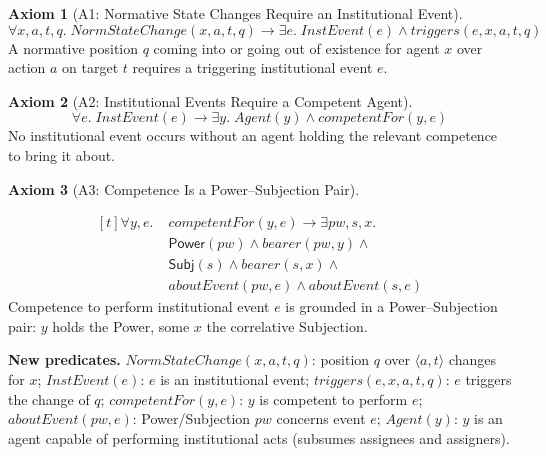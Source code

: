 \documentclass{IOS-Book-Article}
\newcommand{\Power}{\mathsf{Power}}          %
\newcommand{\Subj}{\mathsf{Subj}}       %
\theoremstyle{definition}
\newtheorem{axiom}{Axiom}[section]
\begin{document}
\begin{axiom}[A1: Normative State Changes Require an Institutional Event]
\label{ax:A1}
\[
\forall x,a,t,q.\;
  \mathit{NormStateChange}(x,a,t,q) \to
  \exists e.\;\mathit{InstEvent}(e)\land\mathit{triggers}(e,x,a,t,q)
\]
A normative position $q$ coming into or going out of existence
for agent $x$ over action $a$ on target $t$ requires a triggering
institutional event $e$.
\end{axiom}

\begin{axiom}[A2: Institutional Events Require a Competent Agent]
\label{ax:A2}
\[
\forall e.\;\mathit{InstEvent}(e) \to
  \exists y.\;\mathit{Agent}(y)\land\mathit{competentFor}(y,e)
\]
No institutional event occurs without an agent holding
the relevant competence to bring it about.
\end{axiom}



\begin{axiom}[A3: Competence Is a Power--Subjection Pair]
\label{ax:A3}

\[
\begin{aligned}[t]
\forall y,e.\;&
\mathit{competentFor}(y,e)\to
\exists pw,s,x.\;\\
&\Power(pw)\land\mathit{bearer}(pw,y)\land\\
&\Subj(s)\land\mathit{bearer}(s,x)\land\\
&\mathit{aboutEvent}(pw,e)\land\mathit{aboutEvent}(s,e)
\end{aligned}
\]
Competence to perform institutional event $e$ is grounded in
a Power--Subjection pair: $y$ holds the Power,
some $x$ the correlative Subjection.
\end{axiom}

\noindent\textbf{New predicates.}
$\mathit{NormStateChange}(x,a,t,q)$: position $q$ over
$\langle a,t\rangle$ changes for $x$;
$\mathit{InstEvent}(e)$: $e$ is an institutional event;
$\mathit{triggers}(e,x,a,t,q)$: $e$ triggers the change of $q$;
$\mathit{competentFor}(y,e)$: $y$ is competent to perform $e$;
$\mathit{aboutEvent}(pw,e)$: Power/Subjection $pw$ concerns
event $e$; $\mathit{Agent}(y)$: $y$ is an agent capable of
performing institutional acts (subsumes assignees and
assigners).
\end{document}
